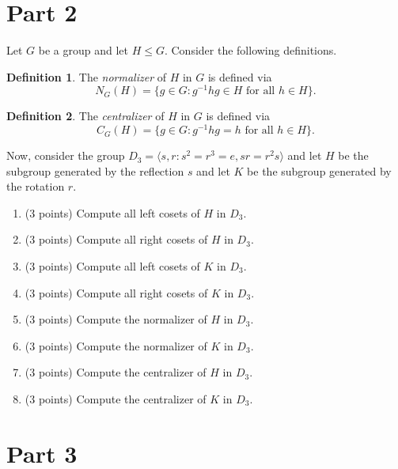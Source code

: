 \documentclass[11pt]{article}
\theoremstyle{definition}
\newtheorem*{definition*}{Definition}
\begin{document}
\section*{Part 2}

Let $G$ be a group and let $H\leq G$. Consider the following definitions.

\begin{definition*}
The \emph{normalizer} of $H$ in $G$ is defined via
\[
N_G(H)=\{g\in G: g^{-1}hg\in H \text{ for all } h\in H\}.
\]
\end{definition*}

\begin{definition*}
The \emph{centralizer} of $H$ in $G$ is defined via
\[
C_G(H)=\{g\in G: g^{-1}hg=h \text{ for all } h\in H\}.
\]
\end{definition*}

Now, consider the group $D_3=\langle s,r:s^2=r^3=e, sr=r^2s\rangle$ and let $H$ be the subgroup generated by the reflection $s$ and let $K$ be the subgroup generated by the rotation $r$.

\begin{enumerate}

\item (3 points) Compute all left cosets of $H$ in $D_3$.

\item (3 points) Compute all right cosets of $H$ in $D_3$.

\item (3 points) Compute all left cosets of $K$ in $D_3$.

\item (3 points) Compute all right cosets of $K$ in $D_3$.

\item (3 points) Compute the normalizer of $H$ in $D_3$.

\item (3 points) Compute the normalizer of $K$ in $D_3$.

\item (3 points) Compute the centralizer of $H$ in $D_3$.

\item (3 points) Compute the centralizer of $K$ in $D_3$.

\end{enumerate}

\section*{Part 3}
\end{document}
